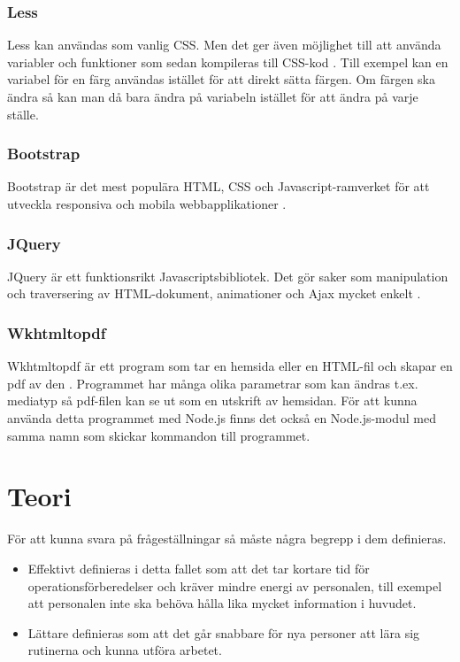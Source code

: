 \documentclass{article}
\begin{document}
\subsubsection{Less}
Less kan användas som vanlig CSS. Men det ger även möjlighet till att använda variabler och funktioner som sedan kompileras till CSS-kod \cite{less}. Till exempel kan en variabel för en färg användas istället för att direkt sätta färgen. Om färgen ska ändra så kan man då bara ändra på variabeln istället för att ändra på varje ställe.

\subsubsection{Bootstrap}
Bootstrap är det mest populära HTML, CSS och Javascript-ramverket för att utveckla responsiva och mobila webbapplikationer \cite{bootstrap}. 

\subsubsection{JQuery}
JQuery är ett funktionsrikt Javascriptsbibliotek. Det gör saker som manipulation och traversering av HTML-dokument, animationer och Ajax mycket enkelt \cite{jquery}.

\subsubsection{Wkhtmltopdf}
Wkhtmltopdf är ett program som tar en hemsida eller en HTML-fil och skapar en pdf av den \cite{wkhtmltopdf}. Programmet har många olika parametrar som kan ändras t.ex. mediatyp så pdf-filen kan se ut som en utskrift av hemsidan. För att kunna använda detta programmet med Node.js finns det också en Node.js-modul med samma namn som skickar kommandon till programmet.


\section{Teori}

För att kunna svara på frågeställningar så måste några begrepp i dem definieras.
\begin{itemize}
\item Effektivt definieras i detta fallet som att det tar kortare tid för operationsförberedelser och kräver mindre energi av personalen, till exempel att personalen inte ska behöva hålla lika mycket information i huvudet. 
\item Lättare definieras som att det går snabbare för nya personer att lära sig rutinerna och kunna utföra arbetet.
\end{itemize}
\end{document}

